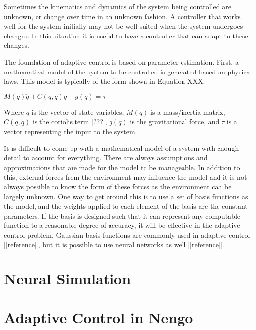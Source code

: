 \documentclass[letterpaper,12pt,titlepage,oneside,final]{book}
\begin{document}
Sometimes the kinematics and dynamics of the system being controlled are unknown, or change over time in an unknown fashion. 
A controller that works well for the system initially may not be well suited when the system undergoes changes. 
In this situation it is useful to have a controller that can adapt to these changes.

The foundation of adaptive control is based on parameter estimation. 
First, a mathematical model of the system to be controlled is generated based on physical laws. 
This model is typically of the form shown in Equation XXX.
\begin{center}
$M(q)\ddot{q} + C(q,\dot{q})\dot{q} + g(q) = \tau$
\end{center}

Where $q$ is the vector of state variables, $M(q)$ is a mass/inertia matrix, $C(q,\dot{q})$ is the coriolis term [???], $g(q)$ is the gravitational force, and $\tau$ is a vector representing the input to the system.


It is difficult to come up with a mathematical model of a system with enough detail to account for everything. 
There are always assumptions and approximations that are made for the model to be manageable. In addition to this, external forces from the environment may influence the model and it is not always possible to know the form of these forces as the environment can be largely unknown. 
One way to get around this is to use a set of basis functions as the model, and the weights applied to each element of the basis are the constant parameters. 
If the basis is designed such that it can represent any computable function to a reasonable degree of accuracy, it will be effective in the adaptive control problem. 
Gaussian basis functions are commonly used in adaptive control [[reference]], but it is possible to use neural networks as well [[reference]].

\section{Neural Simulation}


\section{Adaptive Control in Nengo}
\end{document}
